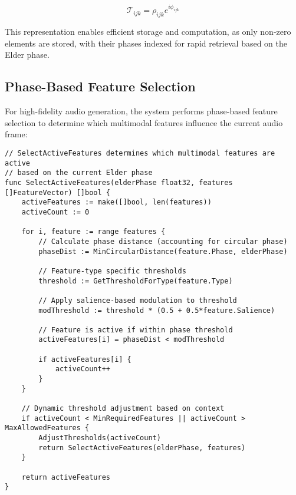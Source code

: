 \begin{equation}
\mathcal{T}_{ijk} = \rho_{ijk}e^{i\phi_{ijk}}
\end{equation}

This representation enables efficient storage and computation, as only non-zero elements are stored, with their phases indexed for rapid retrieval based on the Elder phase.

\subsection{Phase-Based Feature Selection}

For high-fidelity audio generation, the system performs phase-based feature selection to determine which multimodal features influence the current audio frame:

\begin{tcolorbox}[colback=CodeBackground, colframe=DarkGray, title=Multimodal Feature Selection, fonttitle=\bfseries]
\begin{verbatim}
// SelectActiveFeatures determines which multimodal features are active
// based on the current Elder phase
func SelectActiveFeatures(elderPhase float32, features []FeatureVector) []bool {
    activeFeatures := make([]bool, len(features))
    activeCount := 0
    
    for i, feature := range features {
        // Calculate phase distance (accounting for circular phase)
        phaseDist := MinCircularDistance(feature.Phase, elderPhase)
        
        // Feature-type specific thresholds
        threshold := GetThresholdForType(feature.Type)
        
        // Apply salience-based modulation to threshold
        modThreshold := threshold * (0.5 + 0.5*feature.Salience)
        
        // Feature is active if within phase threshold
        activeFeatures[i] = phaseDist < modThreshold
        
        if activeFeatures[i] {
            activeCount++
        }
    }
    
    // Dynamic threshold adjustment based on context
    if activeCount < MinRequiredFeatures || activeCount > MaxAllowedFeatures {
        AdjustThresholds(activeCount)
        return SelectActiveFeatures(elderPhase, features)
    }
    
    return activeFeatures
}
\end{verbatim}
\end{tcolorbox}

